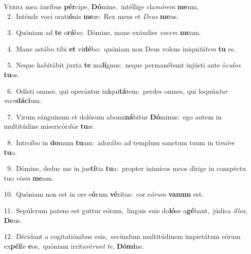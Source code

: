 \lettrine{\initial\textcolor{\initialcolor}{V}}{erba} mea áuribus \textbf{pér}\-cipe, \textbf{Dó}\-mine,~\star intéllige cla\-\textit{mó}\-\textit{rem} \textbf{me}\-um.\\
{\numbfont\textcolor{\numbcolor}{~2.}}~Inténde voci orati\-\textbf{ó}\-nis \textbf{me}\-æ:~\star Rex meus et \textit{De}\-\textit{us} \textbf{me}\-us.\par
{\numbfont\textcolor{\numbcolor}{~3.}}~Quóniam ad \textbf{te} o\-\textbf{rá}\-bo:~\star Dómine, mane exáudies \textit{vo}\-\textit{cem} \textbf{me}\-am.\par
{\numbfont\textcolor{\numbcolor}{~4.}}~Mane astábo tibi \textbf{et} vi\-\textbf{dé}\-bo:~\star quóniam non Deus volens iniqui\-\textit{tá}\-\textit{tem} \textbf{tu} es.\par
{\numbfont\textcolor{\numbcolor}{~5.}}~Neque habitábit juxta \textbf{te} ma\-\textbf{lí}\-gnus:~\star neque permanébunt injústi ante ó\-\textit{cu}\-\textit{los} \textbf{tu}\-os.\par
{\numbfont\textcolor{\numbcolor}{~6.}}~Odísti omnes, qui operántur in\-\textbf{i}\-qui\-\textbf{tá}\-tem:~\star perdes omnes, qui loquún\textit{tur} \textit{men}\-\textbf{dá}\textbf{ci}um.\par
{\numbfont\textcolor{\numbcolor}{~7.}}~Virum sánguinum et dolósum abomi\-\textbf{ná}\-bitur \textbf{Dó}\-minus:~\star ego autem in multitúdine misericór\-\textit{di}\-\textit{æ} \textbf{tu}\-æ.\par
{\numbfont\textcolor{\numbcolor}{~8.}}~Introíbo in \textbf{do}\-mum \textbf{tu}\-am:~\star adorábo ad templum sanctum tuum in ti\-\textit{mó}\-\textit{re} \textbf{tu}\-o.\par
{\numbfont\textcolor{\numbcolor}{~9.}}~Dómine, deduc me in jus\-\textbf{tí}\-tia \textbf{tu}\-a:~\star propter inimícos meos dírige in conspéctu tuo \textit{vi}\-\textit{am} \textbf{me}\-am.\par
{\numbfont\textcolor{\numbcolor}{10.}}~Quóniam non est in ore e\-\textbf{ó}\-rum \textbf{vé}\-ritas:~\star cor e\-\textit{ó}\-\textit{rum} \textbf{va}\-\textbf{num} est.\par
{\numbfont\textcolor{\numbcolor}{11.}}~Sepúlcrum patens est guttur eórum,~\dagger linguis suis do\-\textbf{ló}\-se a\-\textbf{gé}\-bant,~\star júdica \textit{il}\-\textit{los}, \textbf{De}\-us.\par
{\numbfont\textcolor{\numbcolor}{12.}}~Décidant a cogitatiónibus suis,~\dagger secúndum multitúdinem impietátum eórum ex\-\textbf{pél}\-le \textbf{e}\-os,~\star quóniam irritavé\textit{runt} \textit{te}\-, \textbf{Dó}\-\textbf{mi}ne.\par
